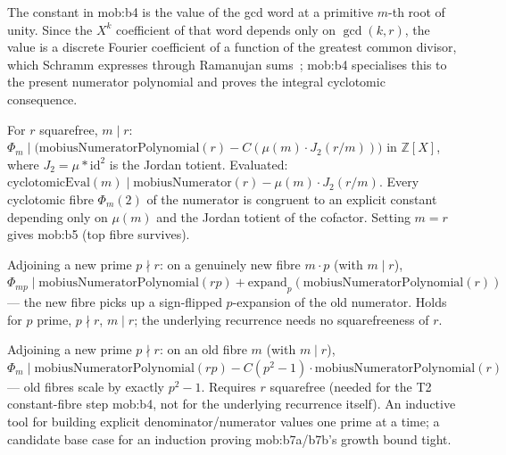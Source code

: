 \noindent The constant in mob:b4 is the value of the gcd word at a primitive
$m$-th root of unity.  Since the $X^k$ coefficient of that word depends only on
$\gcd(k,r)$, the value is a discrete Fourier coefficient of a function of the
greatest common divisor, which Schramm expresses through Ramanujan
sums~\cite[Theorem and (2), p.~2]{schramm-gcd}; mob:b4 specialises this to the
present numerator polynomial and proves the integral cyclotomic consequence.

\begin{prop}
For $r$ squarefree, $m \mid r$: $\Phi_m \mid \big(\mathrm{mobiusNumeratorPolynomial}(r) - C(\mu(m)\cdot J_2(r/m))\big)$ in $\mathbb{Z}[X]$, where $J_2 = \mu * \mathrm{id}^2$ is the Jordan totient. Evaluated: $\mathrm{cyclotomicEval}(m) \mid \mathrm{mobiusNumerator}(r) - \mu(m)\cdot J_2(r/m)$. Every cyclotomic fibre $\Phi_m(2)$ of the numerator is congruent to an explicit constant depending only on $\mu(m)$ and the Jordan totient of the cofactor. Setting $m=r$ gives mob:b5 (top fibre survives).
\par\noindent{}    
\end{prop}

\begin{prop}
Adjoining a new prime $p \nmid r$: on a genuinely new fibre $m\cdot p$ (with $m \mid r$), $\Phi_{mp} \mid \mathrm{mobiusNumeratorPolynomial}(rp) + \mathrm{expand}_p(\mathrm{mobiusNumeratorPolynomial}(r))$ — the new fibre picks up a sign-flipped $p$-expansion of the old numerator. Holds for $p$ prime, $p \nmid r$, $m \mid r$; the underlying recurrence needs no squarefreeness of $r$.
\par\noindent{}    
\end{prop}

\begin{prop}
Adjoining a new prime $p \nmid r$: on an old fibre $m$ (with $m \mid r$), $\Phi_m \mid \mathrm{mobiusNumeratorPolynomial}(rp) - C(p^2-1)\cdot\mathrm{mobiusNumeratorPolynomial}(r)$ — old fibres scale by exactly $p^2-1$. Requires $r$ squarefree (needed for the T2 constant-fibre step mob:b4, not for the underlying recurrence itself). An inductive tool for building explicit denominator/numerator values one prime at a time; a candidate base case for an induction proving mob:b7a/b7b's growth bound tight.
\par\noindent{}   
\end{prop}

